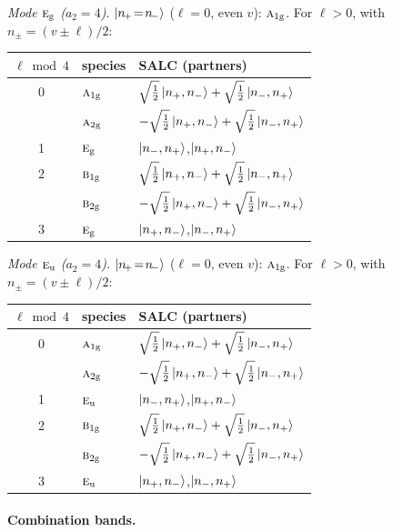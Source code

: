 \documentclass[11pt]{article}
\newcommand{\irr}[1]{\text{\normalfont\scshape #1}}
\newcommand{\ptag}[1]{\mathrm{#1}}
\begin{document}
\emph{Mode $\irr{e}_{\ptag{g}}$ ($a_2=4$).} $\ket{n_{\!+}\!=\!n_{\!-}}$ ($\ell=0$, even $v$): $\irr{a}_{1\ptag{g}}$. For $\ell>0$, with $n_\pm=(v\pm\ell)/2$:
\begin{longtable}{c l l}\hline $\ell\bmod 4$ & species & SALC (partners)\\ \hline\endhead
0 & $\irr{a}_{1\ptag{g}}$ & $\sqrt{\tfrac{1}{2}}\ket{n_+,n_-}+\sqrt{\tfrac{1}{2}}\ket{n_-,n_+}$\\
 & $\irr{a}_{2\ptag{g}}$ & $-\sqrt{\tfrac{1}{2}}\ket{n_+,n_-}+\sqrt{\tfrac{1}{2}}\ket{n_-,n_+}$\\
1 & $\irr{e}_{\ptag{g}}$ & $\ket{n_-,n_+}$,\quad $\ket{n_+,n_-}$\\
2 & $\irr{b}_{1\ptag{g}}$ & $\sqrt{\tfrac{1}{2}}\ket{n_+,n_-}+\sqrt{\tfrac{1}{2}}\ket{n_-,n_+}$\\
 & $\irr{b}_{2\ptag{g}}$ & $-\sqrt{\tfrac{1}{2}}\ket{n_+,n_-}+\sqrt{\tfrac{1}{2}}\ket{n_-,n_+}$\\
3 & $\irr{e}_{\ptag{g}}$ & $\ket{n_+,n_-}$,\quad $\ket{n_-,n_+}$\\
\hline\end{longtable}

\emph{Mode $\irr{e}_{\ptag{u}}$ ($a_2=4$).} $\ket{n_{\!+}\!=\!n_{\!-}}$ ($\ell=0$, even $v$): $\irr{a}_{1\ptag{g}}$. For $\ell>0$, with $n_\pm=(v\pm\ell)/2$:
\begin{longtable}{c l l}\hline $\ell\bmod 4$ & species & SALC (partners)\\ \hline\endhead
0 & $\irr{a}_{1\ptag{g}}$ & $\sqrt{\tfrac{1}{2}}\ket{n_+,n_-}+\sqrt{\tfrac{1}{2}}\ket{n_-,n_+}$\\
 & $\irr{a}_{2\ptag{g}}$ & $-\sqrt{\tfrac{1}{2}}\ket{n_+,n_-}+\sqrt{\tfrac{1}{2}}\ket{n_-,n_+}$\\
1 & $\irr{e}_{\ptag{u}}$ & $\ket{n_-,n_+}$,\quad $\ket{n_+,n_-}$\\
2 & $\irr{b}_{1\ptag{g}}$ & $\sqrt{\tfrac{1}{2}}\ket{n_+,n_-}+\sqrt{\tfrac{1}{2}}\ket{n_-,n_+}$\\
 & $\irr{b}_{2\ptag{g}}$ & $-\sqrt{\tfrac{1}{2}}\ket{n_+,n_-}+\sqrt{\tfrac{1}{2}}\ket{n_-,n_+}$\\
3 & $\irr{e}_{\ptag{u}}$ & $\ket{n_+,n_-}$,\quad $\ket{n_-,n_+}$\\
\hline\end{longtable}

\paragraph{Combination bands.}
\end{document}
